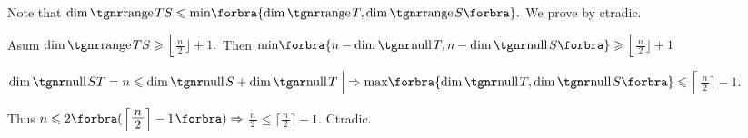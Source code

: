 \par\quad
Note that $\dim\range TS\leqslant\min\!\BigBra{\!\dim\range T,\dim\range S}.$ We prove by ctradic.\par\vspace{2pt}\quad
Asum $\dim\range TS\geqslant \Big\lfloor${\Large$\frac{\,n\,}{2}$}$\Big\rfloor+1.$ \,Then $\min\!\BigBra{n-\dim\null T,n-\dim\null S}\envFontDefault\geqslant \Big\lfloor${\Large$\frac{\,n\,}{2}$}$\Big\rfloor+1$\vspace{3pt}\par\quad
\又 $\dim\null ST=n\leqslant\dim\null S+\dim\null T\;\Big|\hspace{-0.7pt}\Rightarrow\max\!\BigBra{\!\dim\null T,\dim\null S}\envFontDefault\leqslant \Big\lceil${\Large$\frac{\,n\,}{2}$}$\Big\rceil-1.$\par\vspace{3pt}\quad
Thus \;$n\leqslant 2\BigBigPar{\Big\lceil${\Large$\frac{\,n\,}{2}$}$\Big\rceil-1}\Rightarrow{}${\Large$\frac{\,n\,}{2}$}${}\leqslant\Big\lceil${\Large$\frac{\,n\,}{2}$}$\Big\rceil-1$. \;Ctradic.\PfEnd\vspace{8pt}\quad
